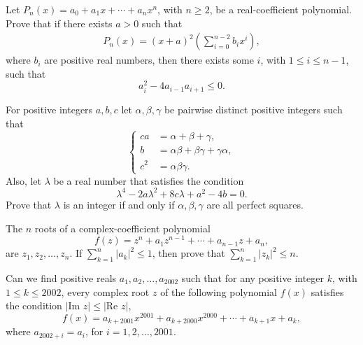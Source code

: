 \documentclass[12pt,a4paper]{memoir}
\theoremstyle{definition}
\begin{document}
\begin{question}[name={2002 China TST}]
	Let $P_n(x)=a_0 + a_1x + \cdots + a_nx^n$, with $n \geq 2$, be a real-coefficient polynomial. Prove that if there exists $a > 0$ such that
	\begin{align*}
		P_n(x) = (x + a)^2 \left( \sum_{i=0}^{n-2} b_i x^i \right),
	\end{align*}
	where $b_i$ are positive real numbers, then there exists some $i$, with $1 \leq i \leq n-1$, such that \[a_i^2 - 4a_{i-1}a_{i+1} \leq 0.\]
\end{question}




\begin{question}[name={2002 China TST}]
	For positive integers $a,b,c$ let $ \alpha, \beta, \gamma$ be pairwise distinct positive integers such that
	\[ \begin{cases}{c} \displaystyle a &= \alpha + \beta + \gamma, \\ 
		b &= \alpha \beta + \beta \gamma + \gamma \alpha, \\
		c^2 &= \alpha\beta\gamma. \end{cases} \]
	Also, let $ \lambda$ be a real number that satisfies the condition
	\[\lambda^4 -2a\lambda^2 + 8c\lambda + a^2 - 4b = 0.\]
	Prove that $\lambda$ is an integer if and only if $\alpha, \beta, \gamma$ are all perfect squares.
\end{question}



\begin{question}[name={2003 China TST}]
	The $n$ roots of a complex-coefficient polynomial \[f(z) = z^n + a_1z^{n - 1} + \cdots + a_{n - 1}z + a_n,\] are $z_1, z_2, \dots, z_n$. If $ \sum_{k = 1}^n |a_k|^2 \leq 1$, then prove that $ \sum_{k = 1}^n |z_k|^2 \leq n$.
\end{question}




\begin{question}[name={2003 China TST}]
	Can we find positive reals $a_1, a_2, \dots, a_{2002}$ such that for any positive integer $k$, with $1 \leq k \leq 2002$, every complex root $z$ of the following polynomial $f(x)$ satisfies the condition $|\text{Im } z| \leq |\text{Re } z|$, 
	\[f(x)=a_{k+2001}x^{2001}+a_{k+2000}x^{2000}+ \cdots + a_{k+1}x+a_k,\]  where $a_{2002+i}=a_i$, for $i=1,2, \dots, 2001$.
\end{question}
\end{document}
